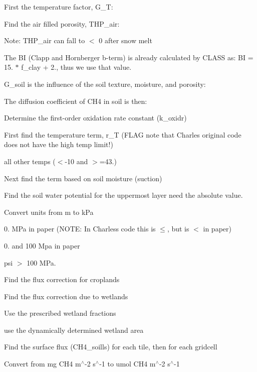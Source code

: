 First the temperature factor, G\+\_\+\+T\+:

Find the air filled porosity, T\+H\+P\+\_\+air\+:

Note\+: T\+H\+P\+\_\+air can fall to $<$ 0 after snow melt

The B\+I (Clapp and Hornberger b-\/term) is already calculated by C\+L\+A\+S\+S as\+: B\+I = 15. $\ast$ f\+\_\+clay + 2., thus we use that value.

G\+\_\+soil is the influence of the soil texture, moisture, and porosity\+:

The diffusion coefficient of C\+H4 in soil is then\+:

Determine the first-\/order oxidation rate constant (k\+\_\+oxidr)

First find the temperature term, r\+\_\+\+T (F\+L\+A\+G note that Charles\textquotesingle{} original code does not have the high temp limit!)

all other temps ($<$-\/10 and $>$=43.)

Next find the term based on soil moisture (suction)

Find the soil water potential for the uppermost layer need the absolute value.

Convert units from m to k\+Pa

0. M\+Pa in paper (N\+O\+T\+E\+: In Charles\textquotesingle{}s code this is $\leq$, but is $<$ in paper)

0. and 100 Mpa in paper

psi $>$ 100 M\+Pa.

Find the flux correction for croplands

Find the flux correction due to wetlands

Use the prescribed wetland fractions

use the dynamically determined wetland area

Find the surface flux (C\+H4\+\_\+soills) for each tile, then for each gridcell

Convert from mg C\+H4 m$^\wedge$-\/2 s$^\wedge$-\/1 to umol C\+H4 m$^\wedge$-\/2 s$^\wedge$-\/1 